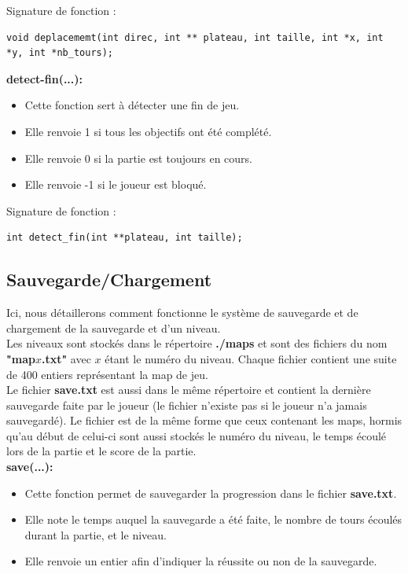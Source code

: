 \documentclass[12pt,french]{article}
\begin{document}
Signature de fonction :
\begin{lstlisting}
void deplacememt(int direc, int ** plateau, int taille, int *x, int *y, int *nb_tours);
\end{lstlisting}

\textbf{detect-fin(...):}
\begin{itemize}
\item Cette fonction sert à détecter une fin de jeu.
\item Elle renvoie 1 si tous les objectifs ont été complété.
\item Elle renvoie 0 si la partie est toujours en cours.
\item Elle renvoie -1 si le joueur est bloqué.
\end{itemize}

Signature de fonction :
\begin{lstlisting}
int detect_fin(int **plateau, int taille);
\end{lstlisting}


\newpage

\subsection{Sauvegarde/Chargement}

Ici, nous détaillerons comment fonctionne le système de sauvegarde et de chargement de la sauvegarde et d'un niveau.\\
Les niveaux sont stockés dans le répertoire \textbf{./maps} et sont des fichiers du nom \textbf{"map$x$.txt"} avec $x$ étant le numéro du niveau. Chaque fichier contient une suite de 400 entiers représentant la map de jeu.\\
Le fichier \textbf{save.txt} est aussi dans le même répertoire et contient la dernière sauvegarde faite par le joueur (le fichier n'existe pas si le joueur n'a jamais sauvegardé). Le fichier est de la même forme que ceux contenant les maps, hormis qu'au début de celui-ci sont aussi stockés le numéro du niveau, le temps écoulé lors de la partie et le score de la partie.\\
\newline
\textbf{save(...):}
\begin{itemize}
\item Cette fonction permet de sauvegarder la progression dans le fichier \textbf{save.txt}.
\item Elle note le temps auquel la sauvegarde a été faite, le nombre de tours écoulés durant la partie, et le niveau.
\item Elle renvoie un entier afin d'indiquer la réussite ou non de la sauvegarde.
\end{itemize}
\end{document}
